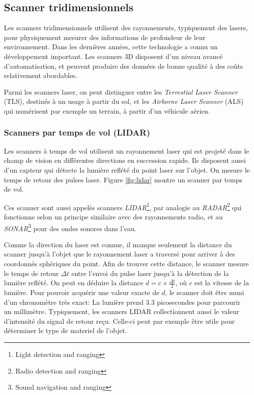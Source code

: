 \documentclass[a4paper,10pt]{scrreprt}
\begin{document}
\subsection{Scanner tridimensionnels}
Les scanners tridimensionnels utilisent des rayonnements, typiquement des lasers, pour physiquement mesurer des informations de profondeur de leur environnement. Dans les dernières années, cette technologie a connu un développement important. Les scanners 3D disposent d'un niveau avancé d'automatisation, et peuvent produire des données de bonne qualité \cite{Grus2012} à des coûts relativement abordables.

Parmi les scanners laser, on peut distinguer entre les \emph{Terrestial Laser Scanner} (TLS), destinés à un usage à partir du sol, et les \emph{Airborne Laser Scanner} (ALS) qui numérisent par exemple un terrain, à partir d'un véhicule aérien.

\subsubsection{Scanners par temps de vol (LIDAR)}
Les scanners à temps de vol utilisent un rayonnement laser qui est projeté dans le champ de vision en différentes directions en succession rapide. Ils disposent aussi d'un capteur qui détecte la lumière reflété du point laser sur l'objet. On mesure le temps de retour des pulses laser. Figure \ref{fig:lidar} montre un scanner par temps de vol. \cite{Web2}

Ces scanner sont aussi appelès scanners \emph{LIDAR}\footnote{Light detection and ranging}, par analogie au \emph{RADAR}\footnote{Radio detection and ranging} qui fonctionne selon un principe similaire avec des rayonnements radio, et au \emph{SONAR}\footnote{Sound navigation and ranging} pour des ondes sonores dans l'eau.

Comme la direction du laser est connue, il manque seulement la distance du scanner jusqu'à l'objet que le rayonnement laser a traversé pour arriver à des coordonnés sphériques du point. Afin de trouver cette distance, le scanner mesure le temps de retour $\Delta t$ entre l'envoi du pulse laser jusqu'à la détection de la lumière reflété. On peut en déduire la distance $d = c \times \frac{\Delta t}{2}$, où $c$ est la vitesse de la lumière. Pour pouvoir acquérir une valeur exacte de $d$, le scanner doit être muni d'un chronomètre très exact: La lumière prend $3.3$ picosecondes pour parcourir un millimètre. Typiquement, les scanners LIDAR collectionnent aussi le valeur d'intensité du signal de retour reçu. Celle-ci peut par exemple être utile pour déterminer le type de materiel de l'objet.
\end{document}
